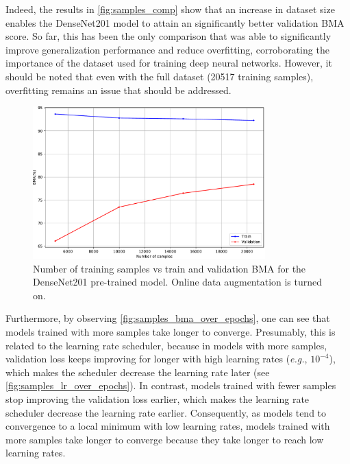     Indeed, the results in \autoref{fig:samples_comp} show that an increase in dataset size enables the DenseNet201 model to attain an significantly better validation \ac{BMA} score. So far, this has been the only comparison that was able to significantly improve generalization performance and reduce overfitting, corroborating the importance of the dataset used for training deep neural networks. However, it should be noted that even with the full dataset (20517 training samples), overfitting remains an issue that should be addressed. \par
    \begin{figure}[ht]
        \centering
        \includegraphics[width=0.8\textwidth]{figs/densenet201_samples_comp.pdf}
        \caption[Number of training samples vs train and validation \ac{BMA} for the DenseNet201 pre-trained model.]{Number of training samples vs train and validation \ac{BMA} for the DenseNet201 pre-trained model. Online data augmentation is turned on.}
        \label{fig:samples_comp}
    \end{figure}
    
    Furthermore, by observing \autoref{fig:samples_bma_over_epochs}, one can see that models trained with more samples take longer to converge. Presumably, this is related to the learning rate scheduler, because in models with more samples, validation loss keeps improving for longer with high learning rates (\textit{e.g.}, $10^{-4}$), which makes the scheduler decrease the learning rate later (see \autoref{fig:samples_lr_over_epochs}). In contrast, models trained with fewer samples stop improving the validation loss earlier, which makes the learning rate scheduler decrease the learning rate earlier. Consequently, as models tend to convergence to a local minimum with low learning rates, models trained with more samples take longer to converge because they take longer to reach low learning rates. \par
    
